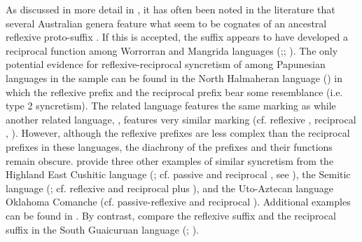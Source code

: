As discussed in more detail in , it has often been noted in the literature that several Australian genera feature what seem to be cognates of an ancestral reflexive proto-suffix . If this  is accepted, the suffix appears to have developed a reciprocal function among Worrorran and Mangrida languages (\citealt[341ff.]{alpher:al:2003};; \citealt[388]{green:2003}). The only potential evidence for reflexive-reciprocal syncretism of  among Papunesian languages in the sample can be found in the North Halmaheran language  () in which the reflexive prefix  and the reciprocal prefix  bear some resemblance (i.e. type 2 syncretism). The related language  features the same marking as  \citep[244]{nedjalkov:2007d} while another related language, , features very similar marking (cf. reflexive , reciprocal , \citealt[199]{heine:miyashita:2008}). However, although the reflexive prefixes are less complex than the reciprocal prefixes in these languages, the diachrony of the prefixes and their functions remain obscure. \cite[198f.]{heine:miyashita:2008} provide three other examples of similar syncretism from the Highland East Cushitic language  (; cf. passive  and reciprocal , see ), the Semitic language  (; cf. reflexive  and reciprocal  plus ), and the Uto-Aztecan language Oklahoma Comanche (cf. passive-reflexive  and reciprocal ). Additional examples can be found in . By contrast, compare the reflexive suffix  and the reciprocal suffix  in the South Guaicuruan language  (; \citealt[171f., 201ff.]{vidal:2001}). 

